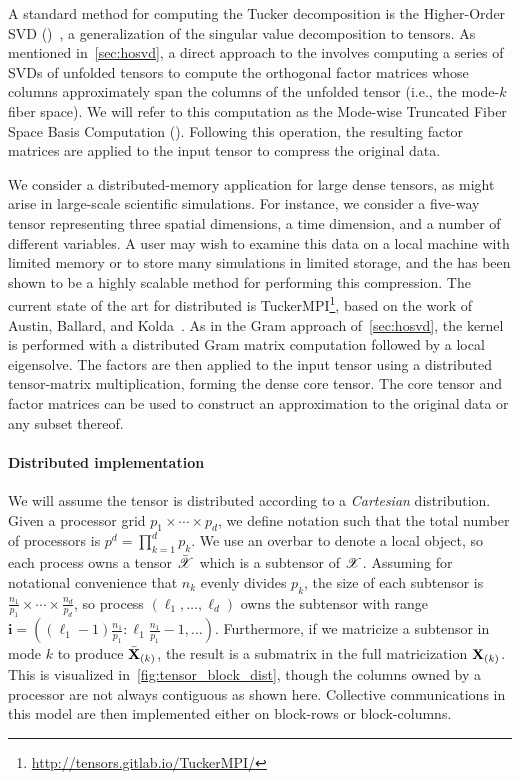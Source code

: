 A standard method for computing the Tucker decomposition is the Higher-Order SVD 
(\hosvd)~\cite{Lathauwer00amultilinear}, a generalization of the singular value 
decomposition to tensors.
% 
As mentioned in~\cref{sec:hosvd}, a direct approach to the \hosvd involves computing a series of SVDs of 
unfolded tensors to compute the orthogonal factor matrices whose 
columns approximately span the columns of the unfolded tensor (i.e., the 
mode-$k$ fiber space). We will refer to this computation as the Mode-wise Truncated Fiber Space Basis Computation (\MTFSBC).
Following this operation, the resulting factor matrices are applied to the input tensor to compress the original data.
%

%
We consider a distributed-memory application for large dense tensors, as might arise in large-scale 
scientific simulations. For instance, we consider a five-way tensor representing three spatial dimensions, 
a time dimension, and a number of different variables. A user may wish to examine this data on a local 
machine with limited memory or to store many simulations in limited storage, and the \hosvd has been 
shown to be a highly scalable method for performing this compression.
The current state of the art for distributed \hosvd is TuckerMPI\footnote{\url{http://tensors.gitlab.io/TuckerMPI/}}, 
based on the work of Austin, Ballard, and Kolda~\cite{AuBaKo16}. As in the Gram approach of~\cref{sec:hosvd}, the \MTFSBC kernel is performed with a distributed Gram matrix computation followed by a local eigensolve. The factors are then applied to the input tensor using a distributed tensor-matrix multiplication, forming the dense core tensor. The core tensor and factor matrices can be used to construct an approximation to the original data or any subset thereof.

\paragraph{Distributed implementation}
We will assume the tensor is distributed according to a \emph{Cartesian} distribution.
Given a processor grid $p_1 \times \cdots \times p_d$, we define notation such that the total number of processors
is $p^d = \prod_{k=1}^d p_k$. We use an overbar to denote a local object,
so each process owns a tensor $\bar{\T{X}}$ which is a subtensor of $\T{X}$.
Assuming for 
notational convenience that $n_k$ evenly divides $p_k$, the size of each subtensor 
is $\frac{n_1}{p_1} \times \cdots \times \frac{n_d}{p_d}$, so process $(\ell_1,\dots,\ell_d)$ 
owns the subtensor  with range $\mathbf{i} = ((\ell_1-1)\frac{n_1}{p_1}:\ell_1\frac{n_1}{p_1}-1,\dots)$. 
Furthermore, if we matricize a subtensor in mode $k$ to produce $\bar{\M{X}}_{(k)}$, 
the result is a submatrix in the full matricization $\M{X}_{(k)}$. 
This is visualized in~\cref{fig:tensor_block_dist}, though the columns owned by a processor are not always contiguous as shown here.
Collective communications in this 
model are then implemented either on block-rows or block-columns. 

